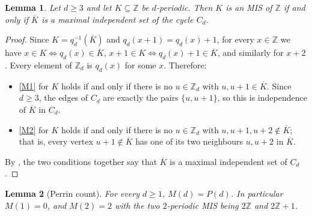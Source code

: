 \documentclass[11pt]{article}
\theoremstyle{plain}
\newtheorem{lemma}[lemma]{Lemma}
\theoremstyle{definition}
\theoremstyle{remark}
\newcommand{\Z}{\mathbb{Z}}
\newcommand{\Per}{P}
\begin{document}
\begin{lemma}\label{lem:periodic-cycle}
Let $d \ge 3$ and let $K \subseteq \Z$ be $d$-periodic. Then $K$ is an MIS of $\Z$ if and only
if $\overline{K}$ is a maximal independent set of the cycle $C_d$.
\end{lemma}

\begin{proof}
Since $K = q_d^{-1}(\overline{K})$ and $q_d(x + 1) = q_d(x) + 1$, for every $x \in \Z$ we have
$x \in K \iff q_d(x) \in \overline{K}$, $x+1 \in K \iff q_d(x)+1 \in \overline{K}$, and
similarly for $x + 2$. Every element of $\Z_d$ is $q_d(x)$ for some $x$. Therefore:
\begin{itemize}
  \item \ref{M1} for $K$ holds if and only if there is no $u \in \Z_d$ with
        $u, u+1 \in \overline{K}$. Since $d \ge 3$, the edges of $C_d$ are exactly the pairs
        $\{u, u+1\}$, so this is independence of $\overline{K}$ in $C_d$.
  \item \ref{M2} for $K$ holds if and only if there is no $u \in \Z_d$ with
        $u, u+1, u+2 \notin \overline{K}$; that is, every vertex $u + 1 \notin \overline{K}$
        has one of its two neighbours $u, u+2$ in $\overline{K}$.
\end{itemize}
By , the two conditions together say that $\overline{K}$ is a maximal
independent set of $C_d$.
\end{proof}

\begin{lemma}[Perrin count]\label{lem:perrin}
For every $d \ge 1$, $M(d) = \Per(d)$. In particular $M(1) = 0$, and $M(2) = 2$ with the two
$2$-periodic MIS being $2\Z$ and $2\Z + 1$.
\end{lemma}
\end{document}
